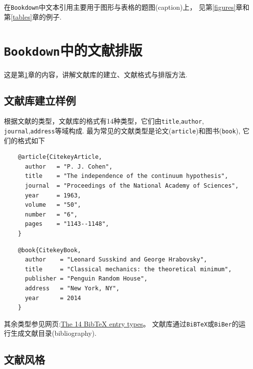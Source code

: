 \documentclass[12pt,]{krantz}
\theoremstyle{plain}
\theoremstyle{nonumberplain}
\begin{document}
\indent

在\texttt{Bookdown}中文本引用主要用于图形与表格的题图(caption)上， 见第\ref{figures}章和第\ref{tables}章的例子.

\printbibliography[segment=\therefsegment, heading=subbibliography, title={参考文献}]

\hypertarget{bibs}{%
\chapter{\texorpdfstring{\texttt{Bookdown}中的文献排版}{Bookdown中的文献排版}}\label{bibs}}

\indent

这是第\ref{bibs}章的内容，讲解文献库的建立、文献格式与排版方法. \autocite{xie2015,R-base}

\hypertarget{sec8-1}{%
\section{文献库建立样例}\label{sec8-1}}

\indent

根据文献的类型，文献库的格式有14种类型，它们由\texttt{title},\texttt{author}, \texttt{journal},\texttt{address}等域构成. 最为常见的文献类型是论文(\texttt{article})和图书(\texttt{book}), 它们的格式如下

\begin{verbatim}
    @article{CitekeyArticle,
      author   = "P. J. Cohen",
      title    = "The independence of the continuum hypothesis",
      journal  = "Proceedings of the National Academy of Sciences",
      year     = 1963,
      volume   = "50",
      number   = "6",
      pages    = "1143--1148",
    }
\end{verbatim}

\begin{verbatim}
    @book{CitekeyBook,
      author    = "Leonard Susskind and George Hrabovsky",
      title     = "Classical mechanics: the theoretical minimum",
      publisher = "Penguin Random House",
      address   = "New York, NY",
      year      = 2014
    }
\end{verbatim}

其余类型参见网页:\href{https://www.bibtex.com/e/entry-types/}{The 14 BibTeX entry types}。
文献库通过\texttt{BiBTeX}或\texttt{BiBer}的运行生成文献目录(bibliography).

\hypertarget{sec8-2}{%
\section{文献风格}\label{sec8-2}}
\end{document}
